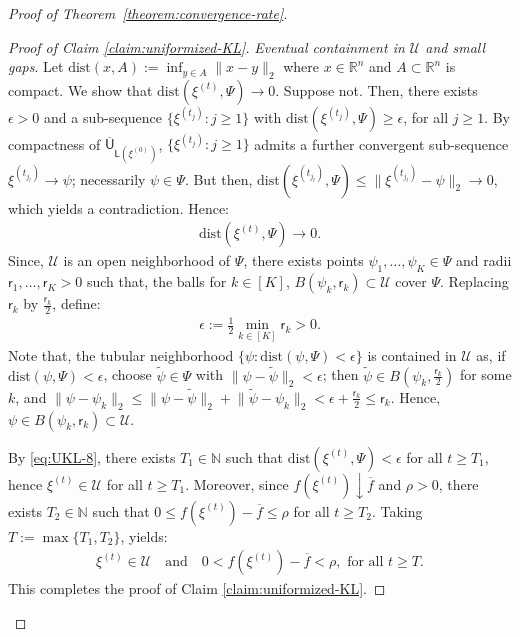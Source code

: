 \documentclass[12pt]{article}
\numberwithin{equation}{section}
\begin{document}
\begin{proof}[Proof of Theorem~\ref{theorem:convergence-rate}]
\begin{proof}[Proof of Claim \ref{claim:uniformized-KL}]
\noindent
\emph{Eventual containment in $\mathcal{U}$ and small gaps}. Let $\mathrm{dist}(x, A) := \inf_{y \in A} \lVert x - y \rVert_2$ where $x \in \mathbb{R}^n$ and $A \subset \mathbb{R}^n$ is compact. We show that $\mathrm{dist}(\xi^{(t)}, \Psi) \to 0$. Suppose not. Then, there exists $\epsilon > 0$ and a sub-sequence $\{\xi^{(t_j)}: j\geq 1\}$ with $\mathrm{dist}(\xi^{(t_j)}, \Psi) \geq \epsilon$, for all $j \geq 1$. By compactness of $\overline{\mathsf{U}}_{\mathsf{L}(\xi^{(0)})}$, $\{\xi^{(t_j)}: j\geq 1\}$ admits a further convergent sub-sequence $\xi^{(t_{j_l})} \to \psi$; necessarily $\psi\in \Psi$. But then, $\mathrm{dist}(\xi^{(t_{j_l})}, \Psi) \leq \lVert \xi^{(t_{j_l})} - \psi\rVert_2 \to 0$, which yields a contradiction. Hence:
\begin{align}\label{eq:UKL-8}
    \mathrm{dist}(\xi^{(t)}, \Psi) \to 0.
\end{align}
Since, $\mathcal{U}$ is an open neighborhood of $\Psi$, there exists points $\psi_1, \ldots, \psi_K \in \Psi$ and radii $\mathsf{r}_1, \ldots, \mathsf{r}_K > 0$ such that, the balls for $k\in [K]$, $B(\psi_k, \mathsf{r}_k) \subset \mathcal{U}$ cover $\Psi$. Replacing $\mathsf{r}_k$ by $\tfrac{\mathsf{r}_{k}}{2}$, define:
\begin{align}\label{eq:UKL-9}
\epsilon:= \frac{1}{2}\min_{k\in [K]}\mathsf{r}_k > 0.
\end{align}
Note that, the tubular neighborhood $\{\psi: \mathrm{dist}(\psi, \Psi) < \epsilon\}$ is contained in $\mathcal{U}$ as, if $\mathrm{dist}(\psi, \Psi) < \epsilon$, choose  $\tilde{\psi} \in \Psi$ with $\lVert \psi - \tilde{\psi}\rVert_2 < \epsilon$; then $\tilde{\psi} \in B\left(\psi_k, \tfrac{\mathsf{r}_k}{2}\right)$ for some $k$, and $\lVert \psi - \psi_k\rVert_2 \leq \lVert \psi - \tilde{\psi}\rVert_2 + \lVert \tilde{\psi} - \psi_k\rVert_2 < \epsilon + \tfrac{\mathsf{r}_k}{2} \leq \mathsf{r}_k$. Hence, $\psi \in B(\psi_k, \mathsf{r}_k)\subset \mathcal{U}$.

By \eqref{eq:UKL-8}, there exists $T_1\in \mathbb{N}$ such that $\mathrm{dist}(\xi^{(t)}, \Psi) < \epsilon$ for all $t\geq T_1$, hence $\xi^{(t)} \in \mathcal{U}$ for all $t\geq T_1$. Moreover, since $f(\xi^{(t)}) \downarrow \overline{f}$ and $\rho>0$, there exists $T_2\in \mathbb{N}$ such that $0\leq f(\xi^{(t)}) - \overline{f}\leq \rho$ for all $t\geq T_2$. Taking $T:= \max\{T_1, T_2\}$, yields:
\begin{align}\label{eq:UKL-10}
\xi^{(t)} \in \mathcal{U}\quad \text{and}\quad 0<f(\xi^{(t)}) - \overline{f}<\rho,\text{ for all $t\geq T$}.
\end{align}
This completes the proof of Claim \ref{claim:uniformized-KL}.
\end{proof}


\end{proof}
\end{document}
